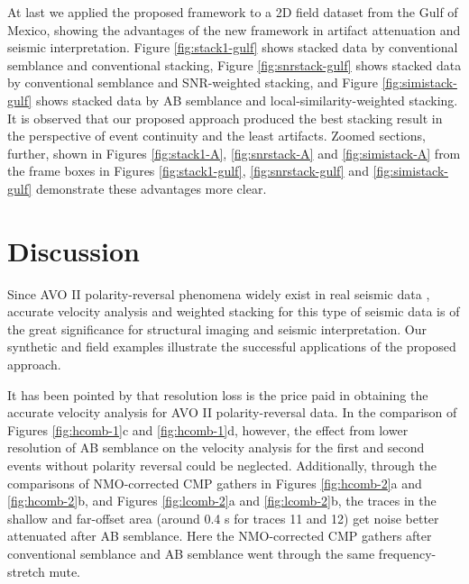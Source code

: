 At last we applied the proposed framework to a 2D field dataset from the Gulf of Mexico, showing the advantages of the new framework in artifact attenuation and seismic interpretation. Figure \ref{fig:stack1-gulf} shows stacked data by conventional semblance and conventional stacking, Figure \ref{fig:snrstack-gulf} shows stacked data by conventional semblance and SNR-weighted stacking, and Figure \ref{fig:simistack-gulf} shows stacked data by AB semblance and local-similarity-weighted stacking. It is observed that our proposed approach produced the best stacking result in the perspective of event continuity and the least artifacts. Zoomed sections, further, shown in Figures \ref{fig:stack1-A}, \ref{fig:snrstack-A} and \ref{fig:simistack-A} from the frame boxes in Figures \ref{fig:stack1-gulf}, \ref{fig:snrstack-gulf} and \ref{fig:simistack-gulf} demonstrate these advantages more clear.


\section{Discussion}

Since AVO II polarity-reversal phenomena widely exist in real seismic data \cite[]{Castagna93}, accurate velocity analysis and weighted stacking for this type of seismic data is of the great significance for structural imaging and seismic interpretation. Our synthetic and field examples illustrate the successful applications of the proposed approach.

It has been pointed by \cite{Fomel09} that resolution loss is the price paid in obtaining the accurate velocity analysis for AVO II polarity-reversal data. In the comparison of Figures \ref{fig:hcomb-1}c and \ref{fig:hcomb-1}d, however, the effect from lower resolution of AB semblance on the velocity analysis for the first and second events without polarity reversal could be neglected. Additionally, through the comparisons of NMO-corrected CMP gathers in Figures \ref{fig:hcomb-2}a and \ref{fig:hcomb-2}b, and Figures \ref{fig:lcomb-2}a and \ref{fig:lcomb-2}b, the traces in the shallow and far-offset area (around 0.4 s for traces 11 and 12) get noise better attenuated after AB semblance. Here the NMO-corrected CMP gathers after conventional semblance and AB semblance went through the same frequency-stretch mute. 

